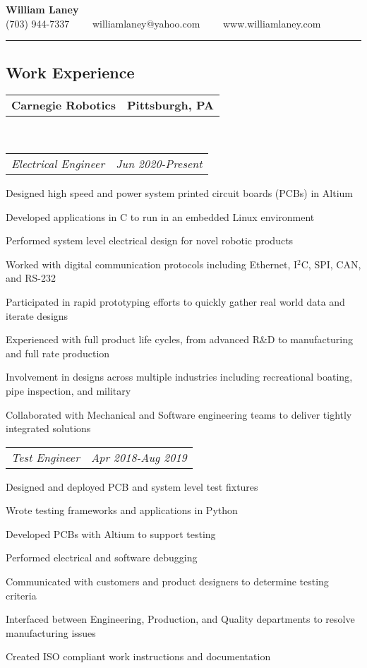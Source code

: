 \documentclass[10pt,letterpaper]{article}
\makeatletter
\newcommand{\headerrow}[2]
{\begin{tabular*}{\linewidth}{l@{\extracolsep{\fill}}r}
	#1 &
	#2 \\
\end{tabular*}}
\makeatother
\begin{document}
\begin{center}
{\LARGE \textbf{William Laney}}\\
\vspace{0.1em}
(703) 944-7337\ \ \textbullet
\ \ williamlaney@yahoo.com\ \ \textbullet
\ \ www.williamlaney.com
\end{center}

\hrule
\vspace{-0.4em}
\subsection*{Work Experience}
\headerrow
		{\textbf{Carnegie Robotics}}
		{\textbf{Pittsburgh, PA}}
	\\
	\headerrow
		{\emph{Electrical Engineer}}
		{\emph{Jun 2020-Present}}
	\begin{itemize*}
		\item Designed high speed and power system printed circuit boards (PCBs) in Altium
		\item Developed applications in C to run in an embedded Linux environment
		\item Performed system level electrical design for novel robotic products
		\item Worked with digital communication protocols including Ethernet, I$^2$C, SPI, CAN, and RS-232
		\item Participated in rapid prototyping efforts to quickly gather real world data and iterate designs
		\item Experienced with full product life cycles, from advanced R\&D to manufacturing and full rate production
		\item Involvement in designs across multiple industries including recreational boating, pipe inspection, and military
		\item Collaborated with Mechanical and Software engineering teams to deliver tightly integrated solutions
		
	\end{itemize*}
	\headerrow
		{\emph{Test Engineer}}
		{\emph{Apr 2018-Aug 2019}}
	\begin{itemize*}
		\item Designed and deployed PCB and system level test fixtures
		\item Wrote testing frameworks and applications in Python		
		\item Developed PCBs with Altium to support testing
		\item Performed electrical and software debugging
		\item Communicated with customers and product designers to determine testing criteria
		\item Interfaced between Engineering, Production, and Quality departments to resolve manufacturing issues
		\item Created ISO compliant work instructions and documentation
	\end{itemize*}
\end{document}
